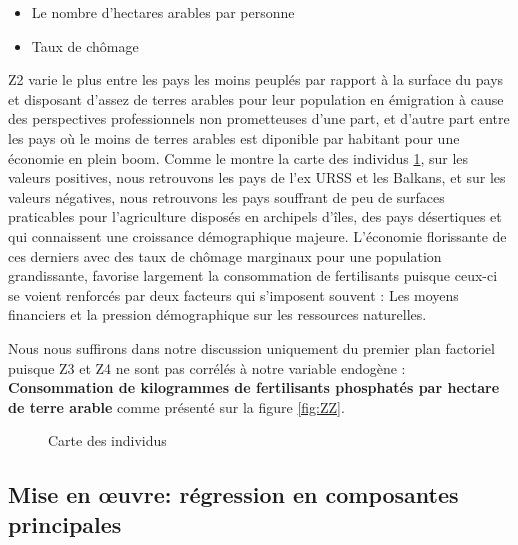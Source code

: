 \begin{enumerate}
\begin{itemize}
\begin{itemize}
		\item Le nombre d'hectares arables par personne
		\item Taux de chômage
		\end{itemize}
		Z2 varie le plus entre les pays les moins peuplés par rapport à la surface du pays et disposant d'assez de terres arables pour leur population en émigration à cause des perspectives professionnels non prometteuses d'une part, et d'autre part entre les pays où le moins de terres arables est diponible par habitant pour une économie en plein boom. Comme le montre la carte des individus \ref{fig:inter3}, sur les valeurs positives, nous retrouvons les pays de l'ex URSS et les Balkans, et sur les valeurs négatives, nous retrouvons les pays souffrant de peu de surfaces praticables pour l'agriculture disposés en archipels d’îles, des pays désertiques et qui connaissent une croissance démographique majeure. L'économie florissante de ces derniers avec des taux de chômage marginaux pour une population grandissante, favorise largement la consommation de fertilisants puisque ceux-ci se voient renforcés par deux facteurs qui s'imposent souvent : Les moyens financiers et la pression démographique sur les ressources naturelles.
		\end{itemize}
		Nous nous suffirons dans notre discussion uniquement du premier plan factoriel puisque Z3 et Z4 ne sont pas corrélés à notre variable endogène : \textbf{Consommation de kilogrammes de fertilisants phosphatés par hectare de terre arable} comme présenté sur la figure \ref{fig:ZZ}.
	\end{enumerate}
					\begin{figure}[H]
					\centering
					\caption{Carte des individus}
					\label{fig:inter3}
					\end{figure}
			
	\subsection{Mise en œuvre: régression en composantes principales}
			
